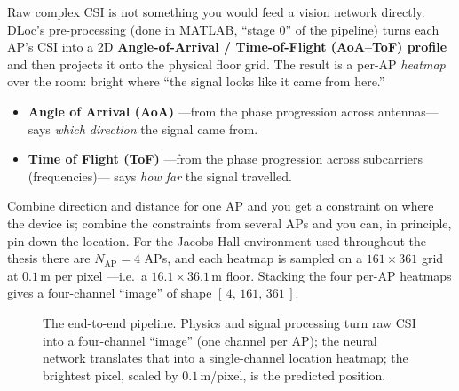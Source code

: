 Raw complex CSI is not something you would feed a vision network directly. DLoc's pre-processing
(done in MATLAB, ``stage 0'' of the pipeline) turns each AP's CSI into a 2D \textbf{Angle-of-Arrival
/ Time-of-Flight (AoA--ToF) profile} and then projects it onto the physical floor grid. The result is
a per-AP \emph{heatmap} over the room: bright where ``the signal looks like it came from here.''

\begin{itemize}[leftmargin=1.4em,nosep]
  \item \textbf{Angle of Arrival (AoA)} ---from the phase progression across antennas--- says
  \emph{which direction} the signal came from.
  \item \textbf{Time of Flight (ToF)} ---from the phase progression across subcarriers (frequencies)---
  says \emph{how far} the signal travelled.
\end{itemize}

Combine direction and distance for one AP and you get a constraint on where the device is; combine
the constraints from several APs and you can, in principle, pin down the location. For the Jacobs
Hall environment used throughout the thesis there are $N_{\text{AP}}=4$ APs, and each heatmap is
sampled on a $161 \times 361$ grid at $0.1$\,m per pixel ---i.e.\ a $16.1 \times 36.1$\,m floor.
Stacking the four per-AP heatmaps gives a four-channel ``image'' of shape $[\,4,\,161,\,361\,]$.

\begin{figure}[H]
\centering
{}
\caption{The end-to-end pipeline. Physics and signal processing turn raw CSI into a four-channel
``image'' (one channel per AP); the neural network translates that into a single-channel location
heatmap; the brightest pixel, scaled by $0.1$\,m/pixel, is the predicted position.}
\label{fig:found:pipeline}
\end{figure}

